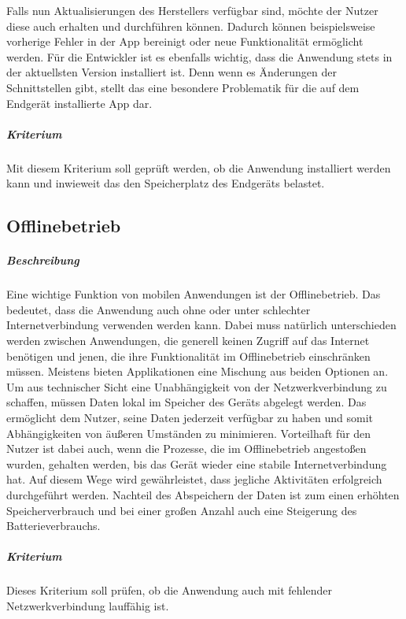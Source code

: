 Falls nun Aktualisierungen des Herstellers verfügbar sind, möchte der Nutzer diese auch erhalten und durchführen können.
Dadurch können beispielsweise vorherige Fehler in der App bereinigt oder neue Funktionalität ermöglicht werden.
Für die Entwickler ist es ebenfalls wichtig, dass die Anwendung stets in der aktuellsten Version installiert ist.
Denn wenn es Änderungen der Schnittstellen gibt, stellt das eine besondere Problematik für die auf dem Endgerät installierte App dar.

\subparagraph{Kriterium\\}
Mit diesem Kriterium soll geprüft werden, ob die Anwendung installiert werden kann und inwieweit das den Speicherplatz des Endgeräts belastet.

\subsection{Offlinebetrieb}
\subparagraph{Beschreibung\\}
Eine wichtige Funktion von mobilen Anwendungen ist der Offlinebetrieb.
Das bedeutet, dass die Anwendung auch ohne oder unter schlechter Internetverbindung verwenden werden kann.
Dabei muss natürlich unterschieden werden zwischen Anwendungen, die generell keinen Zugriff auf das Internet benötigen und jenen, die ihre Funktionalität im Offlinebetrieb einschränken müssen.
Meistens bieten Applikationen eine Mischung aus beiden Optionen an.
Um aus technischer Sicht eine Unabhängigkeit von der Netzwerkverbindung zu schaffen, müssen Daten lokal im Speicher des Geräts abgelegt werden.
Das ermöglicht dem Nutzer, seine Daten jederzeit verfügbar zu haben und somit Abhängigkeiten von äußeren Umständen zu minimieren.
Vorteilhaft für den Nutzer ist dabei auch, wenn die Prozesse, die im Offlinebetrieb angestoßen wurden, gehalten werden, bis das Gerät wieder eine stabile Internetverbindung hat.
Auf diesem Wege wird gewährleistet, dass jegliche Aktivitäten erfolgreich durchgeführt werden.
Nachteil des Abspeichern der Daten ist zum einen erhöhten Speicherverbrauch und bei einer großen Anzahl auch eine Steigerung des Batterieverbrauchs.

\subparagraph{Kriterium\\}
Dieses Kriterium soll prüfen, ob die Anwendung auch mit fehlender Netzwerkverbindung lauffähig ist.

